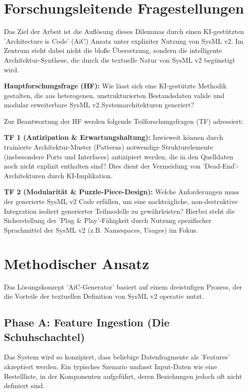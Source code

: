 \documentclass[12pt, a4paper]{article}
\begin{document}
\section{Forschungsleitende Fragestellungen}

Das Ziel der Arbeit ist die Auflösung dieses Dilemmas durch einen KI-gestützten 'Architecture is Code' (AiC) Ansatz unter expliziter Nutzung von SysML v2. Im Zentrum steht dabei nicht die bloße Übersetzung, sondern die intelligente Architektur-Synthese, die durch die textuelle Natur von SysML v2 begünstigt wird.

\textbf{Hauptforschungsfrage (HF):}
Wie lässt sich eine KI-gestützte Methodik gestalten, die aus heterogenen, unstrukturierten Bestandsdaten valide und modular erweiterbare SysML v2 Systemarchitekturen generiert?

Zur Beantwortung der HF werden folgende Teilforschungsfragen (TF) adressiert:

\textbf{TF 1 (Antizipation \& Erwartungshaltung):}
Inwieweit können durch trainierte Architektur-Muster (Patterns) notwendige Strukturelemente (insbesondere Ports und Interfaces) antizipiert werden, die in den Quelldaten noch nicht explizit enthalten sind? Dies dient der Vermeidung von 'Dead-End'-Architekturen durch KI-Implikation.

\textbf{TF 2 (Modularität \& Puzzle-Piece-Design):}
Welche Anforderungen muss der generierte SysML v2 Code erfüllen, um eine nachträgliche, non-destruktive Integration isoliert generierter Teilmodelle zu gewährleisten? Hierbei steht die Sicherstellung der 'Plug \& Play'-Fähigkeit durch Nutzung spezifischer Sprachmittel der SysML v2 (z.B. Namespaces, Usages) im Fokus.

\section{Methodischer Ansatz}

Das Lösungskonzept 'AiC-Generator' basiert auf einem dreistufigen Prozess, der die Vorteile der textuellen Definition von SysML v2 operativ nutzt.

\subsection*{Phase A: Feature Ingestion (Die Schuhschachtel)}
Das System wird so konzipiert, dass beliebige Datenfragmente als 'Features' akzeptiert werden. Ein typisches Szenario umfasst Input-Daten wie eine Bestellliste, in der Komponenten aufgeführt, deren Beziehungen jedoch oft nicht definiert sind.
\end{document}
